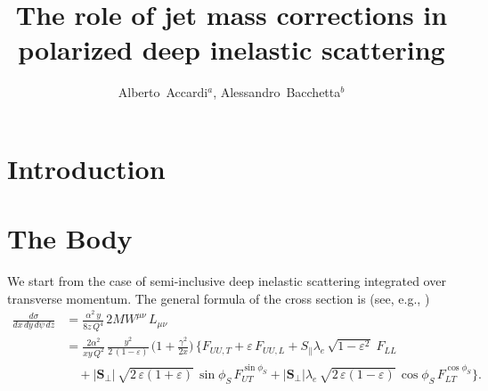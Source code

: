 \documentclass[preprintnumbers,floatfix,nofootinbib]{revtex4}
\newcommand{\xbj}{x}                   %
\begin{document}


\title{The role of jet mass corrections in polarized deep inelastic scattering}

\author{Alberto~Accardi$^{a}$, Alessandro~Bacchetta$^{b}$} 

\begin{abstract}

\end{abstract}



\maketitle


\section{Introduction}

\section{The Body}

We start from the case of semi-inclusive deep inelastic scattering integrated
over transverse momentum. The
general formula of the cross section is (see, e.g., \cite{Bacchetta:2008})
\begin{equation} 
\begin{split} 
\frac{d\sigma}{d\xbj \, dy\, d\psi \,dz}
&
=\frac{\alpha^2\, y}{8 z\, Q^4}\, 2 M W^{\mu \nu}\,
  L_{\mu \nu}
\\
&=
\frac{2 \alpha^2}{\xbj y\, Q^2}\,
\frac{y^2}{2\,(1-\varepsilon)}\, \biggl( 1+\frac{\gamma^2}{2\xbj} \biggr)\,
\biggl\{
F_{UU ,T} + \varepsilon\, F_{UU ,L}
+ S_\parallel \lambda_e\,
  \sqrt{1-\varepsilon^2}\; 
F_{LL}
\\  
&\quad
+ |\bm{S}_\perp|\,
\sqrt{2\,\varepsilon (1+\varepsilon)}\,
  \sin\phi_S\, 
F_{UT}^{\sin \phi_S }
+ |\bm{S}_\perp| \lambda_e\, \sqrt{2\,\varepsilon (1-\varepsilon)}\, 
  \cos\phi_S\, 
F_{LT}^{\cos \phi_S}
 \biggr\}.
\label{e:crossintsidis}
\end{split} 
\end{equation} 
\end{document}

